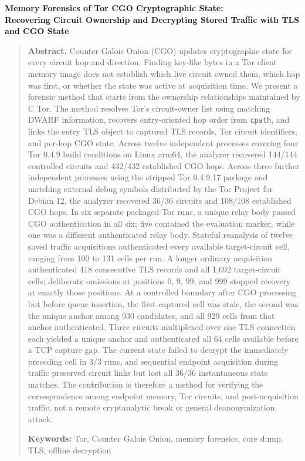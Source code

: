 \documentclass[10pt,a4paper]{ltjsarticle}
\begin{document}
\begin{center}
\textbf{Memory Forensics of Tor CGO Cryptographic State:\\
Recovering Circuit Ownership and Decrypting Stored Traffic with TLS and CGO State}
\end{center}
\begin{quote}\small
\textbf{Abstract.}
Counter Galois Onion (CGO) updates cryptographic state for every circuit hop and direction.
Finding key-like bytes in a Tor client memory image does not establish which live circuit owned them, which hop was first, or whether the state was active at acquisition time.
We present a forensic method that starts from the ownership relationships maintained by C Tor.
The method resolves Tor's circuit-owner list using matching DWARF information, recovers entry-oriented hop order from \texttt{cpath}, and links the entry TLS object to captured TLS records, Tor circuit identifiers, and per-hop CGO state.
Across twelve independent processes covering four Tor 0.4.9 build conditions on Linux arm64, the analyzer recovered 144/144 controlled circuits and 432/432 established CGO hops.
Across three further independent processes using the stripped Tor 0.4.9.17 package and matching external debug symbols distributed by the Tor Project for Debian 12, the analyzer recovered 36/36 circuits and 108/108 established CGO hops.  In six separate packaged-Tor runs, a unique relay body passed CGO authentication in all six; five contained the evaluation marker, while one was a different authenticated relay body.
Stateful reanalysis of twelve saved traffic acquisitions authenticated every available target-circuit cell, ranging from 100 to 131 cells per run. A longer ordinary acquisition authenticated 418 consecutive TLS records and all 1,692 target-circuit cells; deliberate omissions at positions 0, 9, 99, and 999 stopped recovery at exactly those positions. At a controlled boundary after CGO processing but before queue insertion, the first captured cell was stale, the second was the unique anchor among 930 candidates, and all 929 cells from that anchor authenticated. Three circuits multiplexed over one TLS connection each yielded a unique anchor and authenticated all 64 cells available before a TCP capture gap.
The current state failed to decrypt the immediately preceding cell in 3/3 runs, and sequential endpoint acquisition during traffic preserved circuit links but lost all 36/36 instantaneous state matches.
The contribution is therefore a method for verifying the correspondence among endpoint memory, Tor circuits, and post-acquisition traffic, not a remote cryptanalytic break or general deanonymization attack.

\noindent\textbf{Keywords:} Tor, Counter Galois Onion, memory forensics, core dump, TLS, offline decryption
\end{quote}
\end{document}
